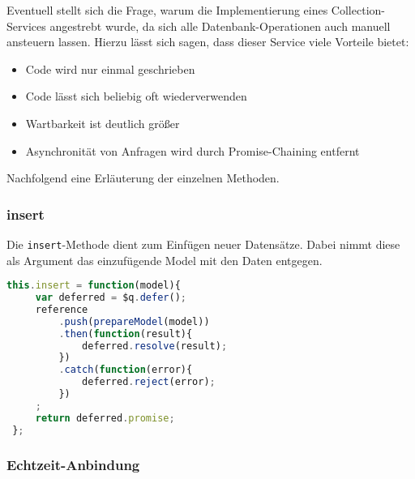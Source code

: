 Eventuell stellt sich die Frage, warum die Implementierung eines Collection-Services angestrebt wurde, da sich alle Datenbank-Operationen auch manuell ansteuern lassen. Hierzu lässt sich
sagen, dass dieser Service viele Vorteile bietet:
\begin{itemize}
\item{Code wird nur einmal geschrieben}
\item{Code lässt sich beliebig oft wiederverwenden}
\item{Wartbarkeit ist deutlich größer}
\item{Asynchronität von Anfragen wird durch Promise-Chaining entfernt}
\end{itemize}

Nachfolgend eine Erläuterung der einzelnen Methoden.

\subsubsection{insert}
Die \texttt{insert}-Methode dient zum Einfügen neuer Datensätze. Dabei nimmt diese als Argument das einzufügende Model mit den Daten entgegen.
 \begin{lstlisting}[language=Javascript, label=code_CollectionInsert, caption=Insert-Methode einer Collection]
 this.insert = function(model){
     var deferred = $q.defer();
     reference
         .push(prepareModel(model))
         .then(function(result){
             deferred.resolve(result);
         })
         .catch(function(error){
             deferred.reject(error);
         })
     ;
     return deferred.promise;
 };
 \end{lstlisting}



\subsubsection{Echtzeit-Anbindung}